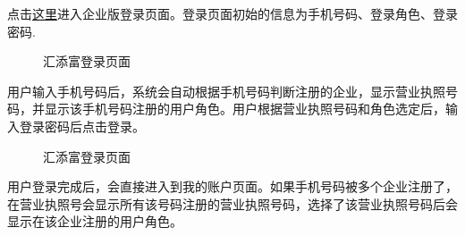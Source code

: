 点击\href{https://qy.99fund.com/instLogin/login.htm}{这里}进入企业版登录页面。登录页面初始的信息为手机号码、登录角色、登录密码.\par

\begin{figure}[htbp!]
	\centering
	\caption{汇添富登录页面}
\end{figure}

用户输入手机号码后，系统会自动根据手机号码判断注册的企业，显示营业执照号码，并显示该手机号码注册的用户角色。用户根据营业执照号码和角色选定后，输入登录密码后点击登录。\par

\begin{figure}[htbp!]
	\centering
	\caption{汇添富登录页面}
\end{figure}

用户登录完成后，会直接进入到我的账户页面。如果手机号码被多个企业注册了，在营业执照号会显示所有该号码注册的营业执照号码，选择了该营业执照号码后会显示在该企业注册的用户角色。